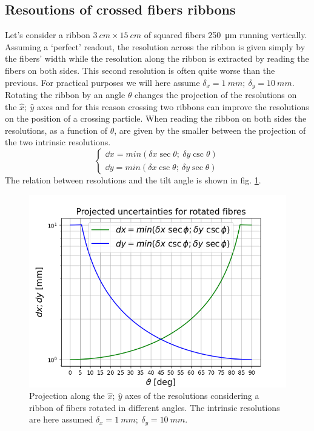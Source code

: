 \begin{refsection}
    \subsection{Resoutions of crossed fibers ribbons}
        Let's consider a ribbon  $\SI{3}{cm}\times\SI{15}{cm}$ of squared fibers \SI{250}{\micro m} running vertically. Assuming a `perfect' readout, the resolution across the ribbon is given simply by the fibers' width while the resolution along the ribbon is extracted by reading the fibers on both sides. This second resolution is often quite worse than the previous. For practical purposes we will here assume $\delta_x = \SI{1}{mm};\ \delta_y = \SI{10}{mm}$.
        Rotating the ribbon by an angle $\theta$ changes the projection of the resolutions on the $\hat{x};\ \hat{y}$ axes and for this reason crossing two ribbons can improve the resolutions on the position of a crossing particle.
        When reading the ribbon on both sides the resolutions, as a function of $\theta$, are given by the smaller between the projection of the two intrinsic resolutions.  
        \begin{equation}
            \begin{cases}
            \dd x = min(\delta x \sec \theta;\ \delta y \csc \theta)\\
            \dd y = min(\delta x \csc \theta;\ \delta y \sec \theta)
            \end{cases}
        \end{equation}
        The relation between resolutions and the tilt angle is shown in fig. \ref{fig:CyFi:projected_dxdy}.  
        \begin{figure}
            \centering
            \includegraphics[width=\textwidth]{Figures/muEDM/CyFi/projected_dxdy.png}
            \caption{Projection along the $\hat{x};\ \hat{y}$ axes of the resolutions considering a ribbon of fibers rotated in different angles. The intrinsic resolutions are here assumed $\delta_x = \SI{1}{mm};\ \delta_y = \SI{10}{mm}$.}
            \label{fig:CyFi:projected_dxdy}
        \end{figure}


\end{refsection}
